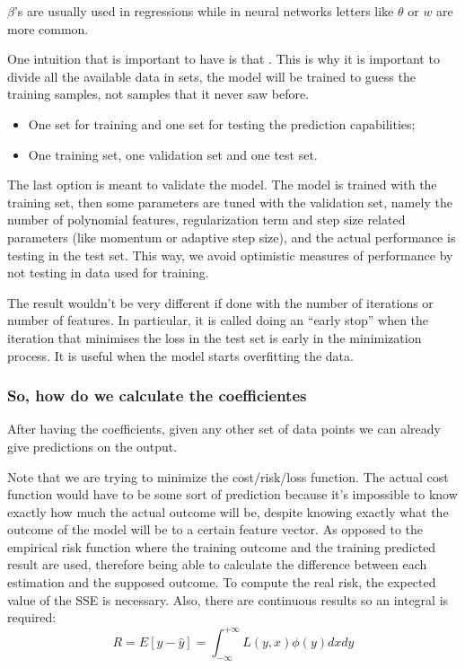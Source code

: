$\beta$'s are usually used in regressions while in neural networks letters like $\theta$ or $w$ are more common.


One intuition that is important to have is that . This is why it is important to divide all the available data in sets, the model will be trained to guess the training samples, not samples that it never saw before.
\begin{itemize}
    \item One set for training and one set for testing the prediction capabilities;
    \item One training set, one validation set and one test set.
\end{itemize}

The last option is meant to validate the model. The model is trained with the training set, then some parameters are tuned with the validation set, namely the number of polynomial features, regularization term and step size related parameters (like momentum or adaptive step size), and the actual performance is testing in the test set. This way, we avoid optimistic measures of performance by not testing in data used for training. 


The result wouldn't be very different if done with the number of iterations or number of features. In particular, it is called doing an ``early stop'' when the iteration that minimises the loss in the test set is early in the minimization process. It is useful when the model starts overfitting the data.



\subsubsection{So, how do we calculate the coefficientes}
\label{sec:calcBetas}
After having the coefficients, given any other set of data points we can already give predictions on the output.

Note that we are trying to minimize the cost/risk/loss function. The actual cost function would have to be some sort of prediction because it's impossible to know exactly how much the actual outcome will be, despite knowing  exactly what the outcome of the model will be to a certain feature vector. As opposed to the empirical risk function where the training outcome and the training predicted result are used, therefore being able to calculate the difference between each estimation and the supposed outcome. To compute the real risk, the expected value of the SSE is necessary. Also, there are continuous results so an integral is required:
\begin{equation}
    R = E[y-\hat{y}] = \int_{-\infty}^{+\infty} L(y, x) \phi(y) dx dy 
\end{equation}

